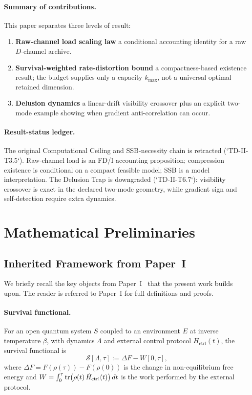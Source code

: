 \documentclass[12pt]{article}
\begin{document}
\paragraph{Summary of contributions.}
This paper separates three levels of result:
\begin{enumerate}
\item \textbf{Raw-channel load scaling law}
  a conditional accounting identity for a raw $D$-channel archive.
\item \textbf{Survival-weighted rate-distortion bound}
  a compactness-based existence result; the budget supplies only a
  capacity $k_{\max}$, not a universal optimal retained dimension.
\item \textbf{Delusion dynamics}
  a linear-drift visibility crossover plus an explicit two-mode
  example showing when gradient anti-correlation can occur.
\end{enumerate}

\paragraph{Result-status ledger.}
The original Computational Ceiling and SSB-necessity chain is retracted
(`TD-II-T3.5`).  Raw-channel load is an FD/I accounting proposition;
compression existence is conditional on a compact feasible model; SSB
is a model interpretation.  The Delusion Trap is downgraded
(`TD-II-T6.7`): visibility crossover is exact in the declared two-mode
geometry, while gradient sign and self-detection require extra dynamics.

\section{Mathematical Preliminaries}
\label{sec:prelim}

\subsection{Inherited Framework from Paper~I}
\label{subsec:inherited}

We briefly recall the key objects from
Paper~I~\cite{Liu2026TDOME_I} that the present work builds
upon.  The reader is referred to Paper~I for full definitions
and proofs.

\paragraph{Survival functional.}
For an open quantum system $S$ coupled to an environment $E$
at inverse temperature $\beta$, with dynamics $\Lambda$ and
external control protocol $H_{\mathrm{ctrl}}(t)$, the
survival functional is
\begin{equation}
\label{eq:survival_recall}
\mathcal{S}[\Lambda, \tau]
:= \Delta F - W[0,\tau],
\end{equation}
where $\Delta F = F(\rho(\tau)) - F(\rho(0))$ is the change
in non-equilibrium free energy and
$W = \int_0^\tau \tr(\rho(t)\,\dot{H}_{\mathrm{ctrl}}(t))\,dt$
is the work performed by the external protocol.
\end{document}
